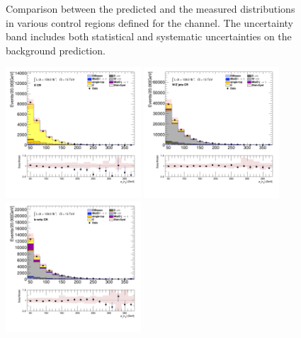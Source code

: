 \begin{figure}[!thp]
\begin{center}
			\end{center}
			\caption{
			Comparison between the predicted and the measured \Etm distributions in various control regions defined for the \taujets channel. The uncertainty band includes both statistical and systematic uncertainties on the background prediction. 
			}
			\label{fig:bkg-met-taujets}
		\end{figure}

		\begin{figure}[!thp]
			\begin{center}    
			\includegraphics[width=0.45\textwidth]{chapters/chapter6_HPlus/images/taujets/tau_0_pt_TTBAR.png}
			\includegraphics[width=0.45\textwidth]{chapters/chapter6_HPlus/images/taujets/tau_0_pt_WJETS.png} \\
			\includegraphics[width=0.45\textwidth]{chapters/chapter6_HPlus/images/taujets/tau_0_pt_BVETO.png}

\end{center}
\end{figure}
